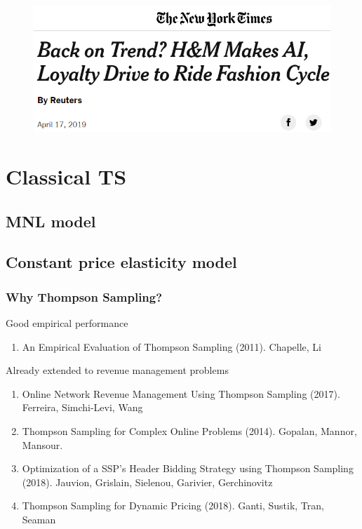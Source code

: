 \documentclass[11pt]{beamer}
\begin{document}
\begin{frame}
\frametitle{}
\begin{figure}[h]
\centering
\includegraphics[width=1\textwidth]{hnm2.png}
\end{figure}
\end{frame}

\section{Classical TS}
\subsection{MNL model}
\subsection{Constant price elasticity model}

\begin{frame}
\frametitle{Why Thompson Sampling?}
Good empirical performance
\begin{enumerate}
\item An Empirical Evaluation of Thompson Sampling (2011). Chapelle, Li
\end{enumerate}
Already extended to revenue management problems
\begin{enumerate}
\item Online Network Revenue Management Using Thompson Sampling (2017). Ferreira, Simchi-Levi, Wang 
\item Thompson Sampling for Complex Online Problems (2014). Gopalan, Mannor, Mansour.
\item Optimization of a SSP’s Header Bidding Strategy using Thompson Sampling (2018). Jauvion, Grislain, Sielenou, Garivier, Gerchinovitz
\item Thompson Sampling for Dynamic Pricing (2018). Ganti, Sustik, Tran, Seaman
\end{enumerate}
\end{frame}
\end{document}
